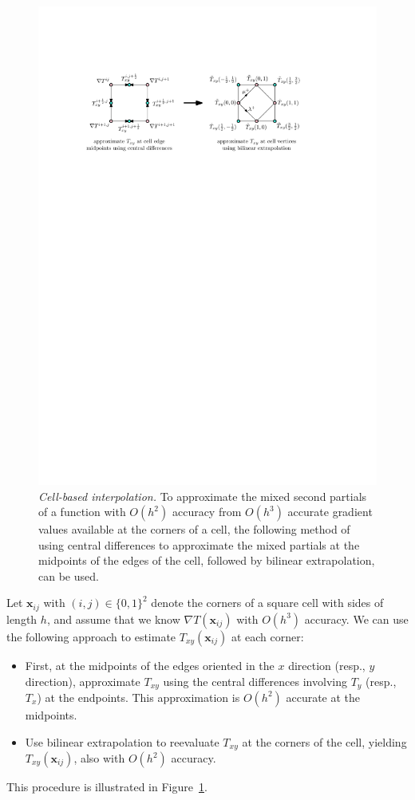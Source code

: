 \documentclass{siamart190516}
\newcommand{\m}[1]{\boldsymbol{#1}}
\begin{document}
\begin{figure}
  \centering
  \includegraphics[width=\textwidth]{estimate-Txy.pdf}
  \caption{\emph{Cell-based interpolation.} To approximate the mixed
    second partials of a function with $O(h^2)$ accuracy from $O(h^3)$
    accurate gradient values available at the corners of a cell, the
    following method of using central differences to approximate the
    mixed partials at the midpoints of the edges of the cell, followed
    by bilinear extrapolation, can be used.}\label{fig:estimate-Txy}
\end{figure}

Let $\m{x}_{ij}$ with $(i, j) \in \{0, 1\}^2$ denote the corners of a
square cell with sides of length $h$, and assume that we know
$\nabla T(\m{x}_{ij})$ with $O(h^3)$ accuracy. We can use the
following approach to estimate $T_{xy}(\m{x}_{ij})$ at each corner:
\begin{itemize}
\item First, at the midpoints of the edges oriented in the $x$
  direction (resp., $y$ direction), approximate $T_{xy}$ using the
  central differences involving $T_y$ (resp., $T_x$) at the
  endpoints. This approximation is $O(h^2)$ accurate at the midpoints.
\item Use bilinear extrapolation to reevaluate $T_{xy}$ at the corners
  of the cell, yielding $T_{xy}(\m{x}_{ij})$, also with $O(h^2)$
  accuracy.
\end{itemize}
This procedure is illustrated in Figure\ \ref{fig:estimate-Txy}.
\end{document}
